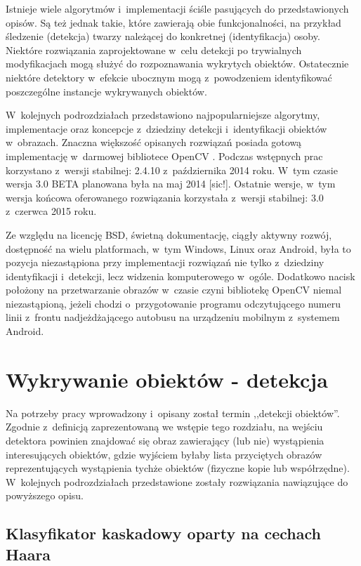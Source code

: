 Istnieje wiele algorytmów i~implementacji ściśle pasujących do
przedstawionych opisów. Są też jednak takie, które zawierają obie
funkcjonalności, na przykład śledzenie (detekcja) twarzy należącej
do konkretnej (identyfikacja) osoby. Niektóre rozwiązania zaprojektowane
w~celu detekcji po trywialnych modyfikacjach mogą służyć
do rozpoznawania wykrytych obiektów. Ostatecznie niektóre detektory
w~efekcie ubocznym mogą z~powodzeniem identyfikować poszczególne
instancje wykrywanych obiektów.

W~kolejnych podrozdziałach
przedstawiono najpopularniejsze algorytmy, implementacje
oraz koncepcje z~dziedziny detekcji i~identyfikacji obiektów w~obrazach.
Znaczna większość opisanych rozwiązań posiada gotową implementację
w~darmowej bibliotece OpenCV \cite{wiki:opencv}.
Podczas wstępnych prac korzystano z~wersji stabilnej: 2.4.10 z~października 2014 roku.
W~tym czasie wersja
3.0 BETA planowana była na maj 2014 [sic!].
Ostatnie wersje, w~tym wersja końcowa oferowanego rozwiązania korzystała 
z~wersji stabilnej: 3.0 z~czerwca 2015 roku.

Ze względu na licencję BSD, świetną
dokumentację, ciągły aktywny rozwój, dostępność na wielu platformach,
w~tym Windows, Linux oraz Android, była to pozycja niezastąpiona
przy implementacji rozwiązań nie tylko z~dziedziny identyfikacji
i~detekcji, lecz widzenia komputerowego w~ogóle. Dodatkowo nacisk
położony na przetwarzanie obrazów w~czasie czyni bibliotekę
OpenCV niemal niezastąpioną, jeżeli chodzi o~przygotowanie
programu odczytującego numeru linii z~frontu nadjeżdżającego
autobusu na urządzeniu mobilnym z~systemem Android.

\section{Wykrywanie obiektów - detekcja}

Na potrzeby pracy wprowadzony i~opisany został termin
,,detekcji obiektów''. Zgodnie z~definicją zaprezentowaną we wstępie
tego rozdziału, na wejściu detektora powinien znajdować się
obraz zawierający (lub nie) wystąpienia interesujących obiektów, gdzie
wyjściem byłaby lista przyciętych obrazów reprezentujących wystąpienia tychże
obiektów (fizyczne kopie lub współrzędne). W~kolejnych podrozdziałach
przedstawione zostały rozwiązania nawiązujące do powyższego opisu.

\subsection{Klasyfikator kaskadowy oparty na cechach Haara}

